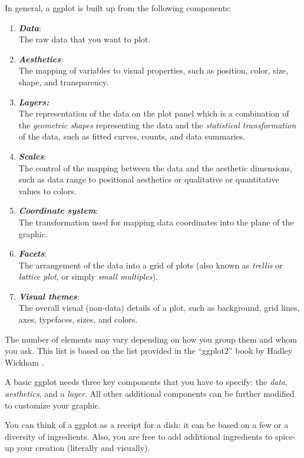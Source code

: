 \documentclass[
]{krantz}
\providecommand{\tightlist}{%
  \setlength{\itemsep}{0pt}\setlength{\parskip}{0pt}}
\begin{document}
In general, a ggplot is built up from the following components:

\begin{enumerate}
\def\labelenumi{\arabic{enumi}.}
\tightlist
\item
  \textbf{\emph{Data}}:\\
  The raw data that you want to plot.
\item
  \textbf{\emph{Aesthetics}}:\\
  The mapping of variables to visual properties, such as position, color, size, shape, and transparency.
\item
  \textbf{\emph{Layers:}}\\
  The representation of the data on the plot panel which is a combination of the \emph{geometric shapes} representing the data and the \emph{statistical transformation} of the data, such as fitted curves, counts, and data summaries.
\item
  \textbf{\emph{Scales}}:\\
  The control of the mapping between the data and the aesthetic dimensions, such as data range to positional aesthetics or qualitative or quantitative values to colors.
\item
  \textbf{\emph{Coordinate system}}:\\
  The transformation used for mapping data coordinates into the plane of the graphic.
\item
  \textbf{\emph{Facets}}:\\
  The arrangement of the data into a grid of plots (also known as \emph{trellis} or \emph{lattice plot}, or simply \emph{small multiples}).
\item
  \textbf{\emph{Visual themes}}:\\
  The overall visual (non-data) details of a plot, such as background, grid lines, axes, typefaces, sizes, and colors.
\end{enumerate}

The number of elements may vary depending on how you group them and whom you ask. This list is based on the list provided in the ``ggplot2'' book by Hadley Wickham \citep{ggplot2}.

A basic ggplot needs three key components that you have to specify: the \emph{data}, \emph{aesthetics}, and a \emph{layer}. All other additional components can be further modified to customize your graphic.

You can think of a ggplot as a receipt for a dish: it can be based on a few or a diversity of ingredients. Also, you are free to add additional ingredients to spice-up your creation (literally and visually).
\end{document}
